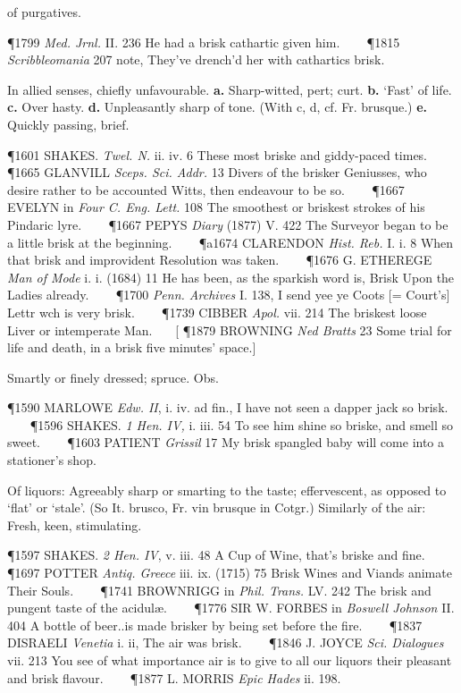 \begin{description}[wide, labelwidth=!, labelindent=0pt]
\begin{myenumerate}
 of purgatives.

\P 1799  \textit{Med. Jrnl.} II. 236 He had a brisk cathartic given him.    
\P 1815  \textit{Scribbleomania} 207 note, They've drench'd her with cathartics brisk.

 In allied senses, chiefly unfavourable. \textbf{a.} Sharp-witted, pert; curt. \textbf{b.} ‘Fast’ of life. \textbf{c.} Over hasty. \textbf{d.} Unpleasantly sharp of tone. (With c, d, cf. Fr. brusque.) \textbf{e.} Quickly passing, brief.

\P 1601 SHAKES.  \textit{Twel. N.} ii. iv. 6 These most briske and giddy-paced times.    
\P 1665 GLANVILL  \textit{Sceps. Sci. Addr.} 13 Divers of the brisker Geniusses, who desire rather to be accounted Witts, then endeavour to be so.    
\P 1667 EVELYN in  \textit{Four C. Eng. Lett.} 108 The smoothest or briskest strokes of his Pindaric lyre.    
\P 1667 PEPYS  \textit{Diary} (1877) V. 422 The Surveyor began to be a little brisk at the beginning.    
\P a1674 CLARENDON  \textit{Hist. Reb.} I. i. 8 When that brisk and improvident Resolution was taken.    
\P 1676 G. ETHEREGE  \textit{Man of Mode} i. i. (1684) 11 He has been, as the sparkish word is, Brisk Upon the Ladies already.    
\P 1700 \textit{Penn.  Archives} I. 138, I send yee ye Coots [= Court's] Lettr wch is very brisk.    
\P 1739 CIBBER  \textit{Apol.} vii. 214 The briskest loose Liver or intemperate Man.    [
\P 1879 BROWNING  \textit{Ned Bratts} 23 Some trial for life and death, in a brisk five minutes' space.]

 Smartly or finely dressed; spruce. Obs.

\P 1590 MARLOWE  \textit{Edw. II}, i. iv. ad fin., I have not seen a dapper jack so brisk.    
\P 1596 SHAKES.  \textit{1 Hen. IV,} i. iii. 54 To see him shine so briske, and smell so sweet.    
\P 1603 PATIENT  \textit{Grissil} 17 My brisk spangled baby will come into a stationer's shop.

 Of liquors: Agreeably sharp or smarting to the taste; effervescent, as opposed to ‘flat’ or ‘stale’. (So It. brusco, Fr. vin brusque in Cotgr.) Similarly of the air: Fresh, keen, stimulating.

\P 1597 SHAKES.  \textit{2 Hen. IV}, v. iii. 48 A Cup of Wine, that's briske and fine.    
\P 1697 POTTER  \textit{Antiq. Greece} iii. ix. (1715) 75 Brisk Wines and Viands animate Their Souls.    
\P 1741 BROWNRIGG in  \textit{Phil. Trans.} LV. 242 The brisk and pungent taste of the acidulæ.    
\P 1776 SIR W. FORBES in \textit{Boswell Johnson} II. 404 A bottle of beer..is made brisker by being set before the fire.    
\P 1837 DISRAELI  \textit{Venetia} i. ii, The air was brisk.    
\P 1846 J. JOYCE  \textit{Sci. Dialogues} vii. 213 You see of what importance air is to give to all our liquors their pleasant and brisk flavour.    
\P 1877 L. MORRIS  \textit{Epic Hades} ii. 198.


\end{myenumerate}
\end{description}
